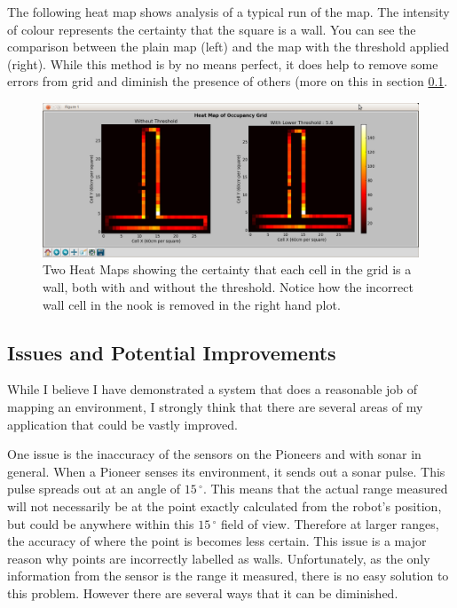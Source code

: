 \documentclass{article}
\begin{document}
The following heat map shows analysis of a typical run of the map. The intensity of colour represents the certainty that the square is a wall. You can see the comparison between the plain map (left) and the map with the threshold applied (right). While this method is by no means perfect, it does help to remove some errors from grid and diminish the presence of others (more on this in section \ref{sec:issues}.
 
\begin{figure}[H]
\centering
\includegraphics[width=1.1\textwidth]{final_example.png}
\caption{Two Heat Maps showing the certainty that each cell in the grid is a wall, both with and without the threshold. Notice how the incorrect wall cell in the nook is removed in the right hand plot.}
\label{fig:final-example}
\end{figure}

\subsection{Issues and Potential Improvements}
\label{sec:issues}
While I believe I have demonstrated a system that does a reasonable job of mapping an environment, I strongly think that there are several areas of my application that could be vastly improved.

One issue is the inaccuracy of the sensors on the Pioneers and with sonar in general. When a Pioneer senses its environment, it sends out a sonar pulse. This pulse spreads out at an angle of $15\,^\circ$. This means that the actual range measured will not necessarily be at the point exactly calculated from the robot's position, but could be anywhere within this $15\,^\circ$ field of view. Therefore at larger ranges, the accuracy of where the point is becomes less certain. This issue is a major reason why points are incorrectly labelled as walls. Unfortunately, as the only information from the sensor is the range it measured, there is no easy solution to this problem. However there are several ways that it can be diminished. 
\end{document}
